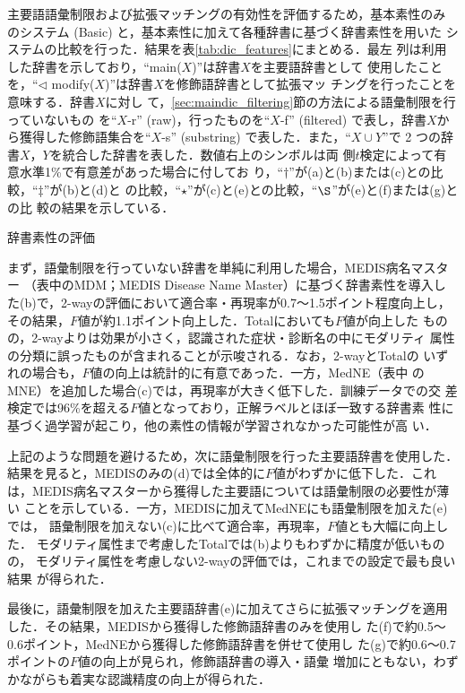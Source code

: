 \documentclass[japanese]{jnlp_1.4}
\begin{document}
主要語語彙制限および拡張マッチングの有効性を評価するため，基本素性のみ
のシステム (Basic) と，基本素性に加えて各種辞書に基づく辞書素性を用いた
システムの比較を行った．結果を表\ref{tab:dic_features}にまとめる．最左
列は利用した辞書を示しており，``main($X$)''は辞書$X$を主要語辞書として
使用したことを，``$\lhd$ modify($X$)''は辞書$X$を修飾語辞書として拡張マッ
チングを行ったことを意味する．辞書$X$に対し
て，\ref{sec:maindic_filtering}節の方法による語彙制限を行っていないもの
を``$X$-r'' (raw)，行ったものを``$X$-f'' (filtered) で表し，辞書$X$か
ら獲得した修飾語集合を``$X$-s'' (substring) で表した．また，``$X\cup
Y$''で 2 つの辞書$X$，$Y$を統合した辞書を表した．数値右上のシンボルは両
側$t$検定によって有意水準1\%で有意差があった場合に付してお
り，``$\dagger$''が(a)と(b)または(c)との比較，``$\ddagger$''が(b)と(d)と
の比較，``$\star$''が(c)と(e)との比較，``$\S$''が(e)と(f)または(g)との比
較の結果を示している．

\begin{table}[b] 
 \caption{辞書素性の評価}
\label{tab:dic_features}

\end{table}

まず，語彙制限を行っていない辞書を単純に利用した場合，MEDIS病名マスター
（表中のMDM；MEDIS Disease Name Master）に基づく辞書素性を導入し
た(b)で，2-wayの評価において適合率・再現率が0.7〜1.5ポイント程度向上し，
その結果，$F$値が約1.1ポイント向上した．Totalにおいても$F$値が向上した
ものの，2-wayよりは効果が小さく，認識された症状・診断名の中にモダリティ
属性の分類に誤ったものが含まれることが示唆される．なお，2-wayとTotalの
いずれの場合も，$F$値の向上は統計的に有意であった．一方，MedNE（表中
のMNE）を追加した場合(c)では，再現率が大きく低下した．訓練データでの交
差検定では96\%を超える$F$値となっており，正解ラベルとほぼ一致する辞書素
性に基づく過学習が起こり，他の素性の情報が学習されなかった可能性が高
い．

上記のような問題を避けるため，次に語彙制限を行った主要語辞書を使用した．
結果を見ると，MEDISのみの(d)では全体的に$F$値がわずかに低下した．これ
は，MEDIS病名マスターから獲得した主要語については語彙制限の必要性が薄い
ことを示している．一方，MEDISに加えてMedNEにも語彙制限を加えた(e)では，
語彙制限を加えない(c)に比べて適合率，再現率，$F$値とも大幅に向上した．
モダリティ属性まで考慮したTotalでは(b)よりもわずかに精度が低いものの，
モダリティ属性を考慮しない2-wayの評価では，これまでの設定で最も良い結果
が得られた．

最後に，語彙制限を加えた主要語辞書(e)に加えてさらに拡張マッチングを適用
した．その結果，MEDISから獲得した修飾語辞書のみを使用し
た(f)で約0.5〜0.6ポイント，MedNEから獲得した修飾語辞書を併せて使用し
た(g)で約0.6〜0.7ポイントの$F$値の向上が見られ，修飾語辞書の導入・語彙
増加にともない，わずかながらも着実な認識精度の向上が得られた．
\end{document}
